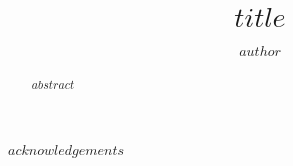 \documentclass[
$if(draft)$
  draft,
$endif$
$if(fontsize)$
  $fontsize$,
$endif$
$if(margins)$
  $margins$,
$endif$
$if(spacing)$
  $spacing$,
$endif$
$if(clearpagestyle)$
  $clearpagestyle$,
$endif$
$if(notespacing)$
  $notespacing$,
$endif$
$for(classoption)$
  $classoption$$sep$,
$endfor$
]{$ut-class$}
\author{$author$}
\title{$title$}
\begin{document}
\begin{preliminary}

\maketitle


\begin{abstract}
$abstract$ %
\end{abstract}





\begin{acknowledgements}
$acknowledgements$ %
\end{acknowledgements}



\end{preliminary}
\end{document}
